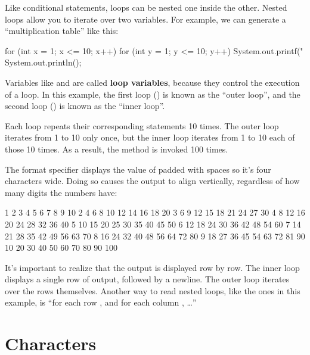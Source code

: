 
Like conditional statements, loops can be nested one inside the other.
Nested loops allow you to iterate over two variables.
For example, we can generate a ``multiplication table'' like this:

\begin{code}
for (int x = 1; x <= 10; x++) {
    for (int y = 1; y <= 10; y++) {
        System.out.printf("%
    }
    System.out.println();
}
\end{code}


Variables like  and  are called {\bf loop variables}, because they control the execution of a loop.
In this example, the first loop () is known as the ``outer loop'', and the second loop () is known as the ``inner loop''.

Each loop repeats their corresponding statements 10 times.
The outer loop iterates from 1 to 10 only once, but the inner loop iterates from 1 to 10 each of those 10 times.
As a result, the  method is invoked 100 times.


The format specifier  displays the value of  padded with spaces so it's four characters wide.
Doing so causes the output to align vertically, regardless of how many digits the numbers have:

\begin{stdout}
   1   2   3   4   5   6   7   8   9  10
   2   4   6   8  10  12  14  16  18  20
   3   6   9  12  15  18  21  24  27  30
   4   8  12  16  20  24  28  32  36  40
   5  10  15  20  25  30  35  40  45  50
   6  12  18  24  30  36  42  48  54  60
   7  14  21  28  35  42  49  56  63  70
   8  16  24  32  40  48  56  64  72  80
   9  18  27  36  45  54  63  72  81  90
  10  20  30  40  50  60  70  80  90 100
\end{stdout}

It's important to realize that the output is displayed row by row.
The inner loop displays a single row of output, followed by a newline.
The outer loop iterates over the rows themselves.
Another way to read nested loops, like the ones in this example, is ``for each row , and for each column , \ldots''


\section{Characters}


